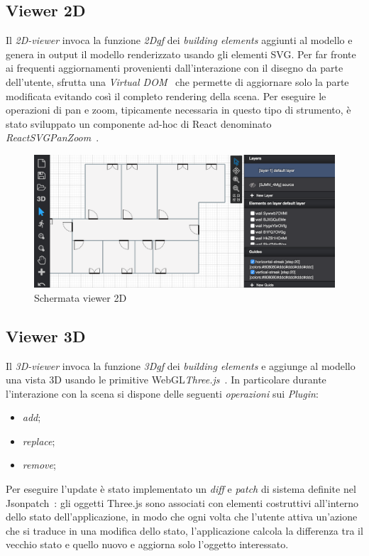 \subsection{Viewer 2D}
Il \emph{2D-viewer} invoca la funzione \emph{2Dgf} dei \emph{building elements} aggiunti al modello e
genera in output il modello renderizzato usando gli elementi SVG.
Per far fronte ai frequenti aggiornamenti provenienti dall'interazione con il disegno da parte dell'utente,
sfrutta una \emph{Virtual DOM}~\cite{vdom} che permette di aggiornare solo la parte modificata evitando così
il completo rendering della scena. Per eseguire le operazioni di pan e zoom, tipicamente necessaria in questo
tipo di strumento, è stato sviluppato un componente ad-hoc di React denominato \emph{ReactSVGPanZoom}~\cite{panzoom}.\\


\begin{figure}[htbp] %
   \centering
   \includegraphics[width=1\linewidth]{images/2d}
   \caption{Schermata viewer 2D}
   \label{fig:view2D}
\end{figure}
\newpage


\subsection{Viewer 3D}
Il \emph{3D-viewer} invoca la funzione \emph{3Dgf} dei \emph{building elements} e aggiunge al modello una vista 3D usando
le primitive WebGL\emph{Three.js}~\cite{threejs-site}.
In particolare durante l'interazione con la scena si dispone delle seguenti \textit{operazioni} sui \emph{Plugin}:
\begin{itemize}
  \item \emph{add};
  \item \emph{replace};
  \item \emph{remove};
\end{itemize}
Per eseguire l'update è stato implementato un \emph{diff} e \emph{patch} di
sistema definite nel Jsonpatch~\cite{rfc6902}: gli oggetti Three.js sono associati con elementi costruttivi all'interno
dello stato dell'applicazione, in modo che ogni volta che l'utente attiva un'azione che si traduce in una modifica dello stato,
l'applicazione calcola la differenza tra il vecchio stato e quello nuovo e aggiorna solo l'oggetto interessato.\\


